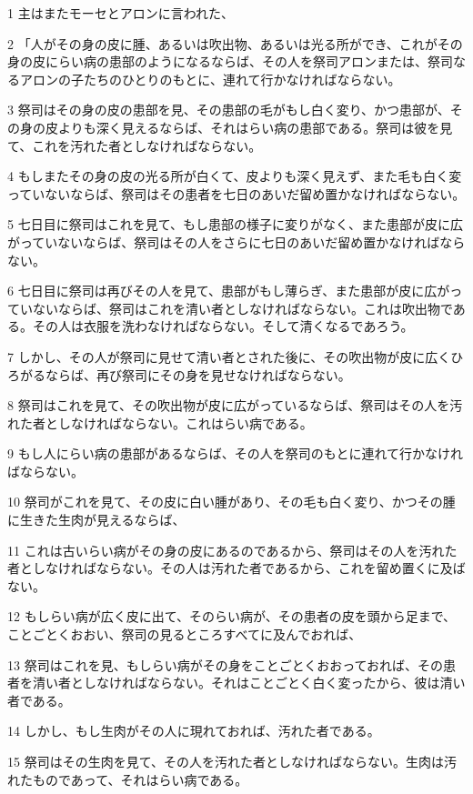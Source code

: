 \par 1 主はまたモーセとアロンに言われた、
\par 2 「人がその身の皮に腫、あるいは吹出物、あるいは光る所ができ、これがその身の皮にらい病の患部のようになるならば、その人を祭司アロンまたは、祭司なるアロンの子たちのひとりのもとに、連れて行かなければならない。
\par 3 祭司はその身の皮の患部を見、その患部の毛がもし白く変り、かつ患部が、その身の皮よりも深く見えるならば、それはらい病の患部である。祭司は彼を見て、これを汚れた者としなければならない。
\par 4 もしまたその身の皮の光る所が白くて、皮よりも深く見えず、また毛も白く変っていないならば、祭司はその患者を七日のあいだ留め置かなければならない。
\par 5 七日目に祭司はこれを見て、もし患部の様子に変りがなく、また患部が皮に広がっていないならば、祭司はその人をさらに七日のあいだ留め置かなければならない。
\par 6 七日目に祭司は再びその人を見て、患部がもし薄らぎ、また患部が皮に広がっていないならば、祭司はこれを清い者としなければならない。これは吹出物である。その人は衣服を洗わなければならない。そして清くなるであろう。
\par 7 しかし、その人が祭司に見せて清い者とされた後に、その吹出物が皮に広くひろがるならば、再び祭司にその身を見せなければならない。
\par 8 祭司はこれを見て、その吹出物が皮に広がっているならば、祭司はその人を汚れた者としなければならない。これはらい病である。
\par 9 もし人にらい病の患部があるならば、その人を祭司のもとに連れて行かなければならない。
\par 10 祭司がこれを見て、その皮に白い腫があり、その毛も白く変り、かつその腫に生きた生肉が見えるならば、
\par 11 これは古いらい病がその身の皮にあるのであるから、祭司はその人を汚れた者としなければならない。その人は汚れた者であるから、これを留め置くに及ばない。
\par 12 もしらい病が広く皮に出て、そのらい病が、その患者の皮を頭から足まで、ことごとくおおい、祭司の見るところすべてに及んでおれば、
\par 13 祭司はこれを見、もしらい病がその身をことごとくおおっておれば、その患者を清い者としなければならない。それはことごとく白く変ったから、彼は清い者である。
\par 14 しかし、もし生肉がその人に現れておれば、汚れた者である。
\par 15 祭司はその生肉を見て、その人を汚れた者としなければならない。生肉は汚れたものであって、それはらい病である。
